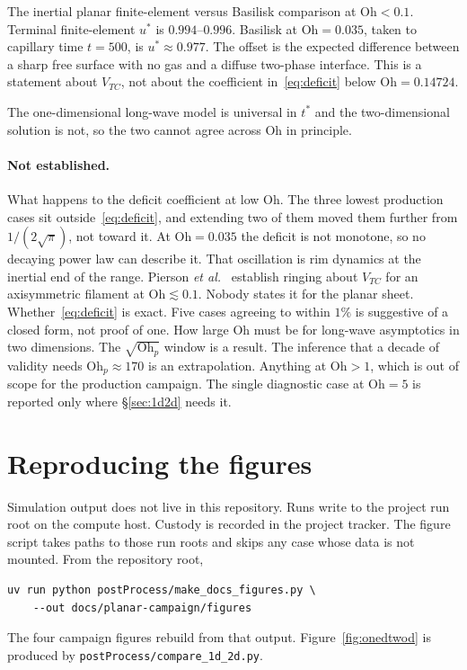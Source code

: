 \documentclass[11pt,a4paper]{article}
\newcommand{\Oh}{\mathrm{Oh}}
\newcommand{\Ohp}{\mathrm{Oh}_{p}}
\newcommand{\Vtc}{V_{TC}}
\newcommand{\ustar}{u^{*}}
\newcommand{\tstar}{t^{*}}
\begin{document}
The inertial planar finite-element versus Basilisk comparison at
$\Oh < 0.1$. Terminal finite-element $\ustar$ is $0.994$--$0.996$. Basilisk
at $\Oh = 0.035$, taken to capillary time $t = 500$, is $\ustar \approx 0.977$.
The offset is the expected difference between a sharp free surface with no gas
and a diffuse two-phase interface. This is a statement about $\Vtc$, not about
the coefficient in~\eqref{eq:deficit} below $\Oh = 0.14724$.

The one-dimensional long-wave model is universal in $\tstar$ and the
two-dimensional solution is not, so the two cannot agree across $\Oh$
in principle.

\paragraph{Not established.}
What happens to the deficit coefficient at low $\Oh$. The three lowest
production cases sit outside~\eqref{eq:deficit}, and extending two of them
moved them further from $1/(2\sqrt{\pi})$, not toward it. At $\Oh = 0.035$
the deficit is not monotone, so no decaying power law can describe it. That
oscillation is rim dynamics at the inertial end of the range. Pierson
\textit{et al.}\ \cite{pierson2020} establish ringing about $\Vtc$ for an
axisymmetric filament at $\Oh \lesssim 0.1$. Nobody states it for the
planar sheet. Whether~\eqref{eq:deficit} is exact. Five cases agreeing to
within $1\%$ is suggestive of a closed form, not proof of one. How large
$\Oh$ must be for long-wave asymptotics in two dimensions. The
$\sqrt{\Ohp}$ window is a result. The inference that a decade of validity needs
$\Ohp \approx 170$ is an extrapolation. Anything at $\Oh > 1$, which is out
of scope for the production campaign. The single diagnostic case at
$\Oh = 5$ is reported only where \S\ref{sec:1d2d} needs it.

\section{Reproducing the figures}
\label{sec:repro}

Simulation output does not live in this repository. Runs write to the project
run root on the compute host. Custody is recorded in the project tracker. The
figure script takes paths to those run roots and skips any case whose data is
not mounted. From the repository root,
\begin{verbatim}
uv run python postProcess/make_docs_figures.py \
    --out docs/planar-campaign/figures
\end{verbatim}
The four campaign figures rebuild from that output.
Figure~\ref{fig:onedtwod} is produced by \texttt{postProcess/compare\_1d\_2d.py}.



\end{document}
